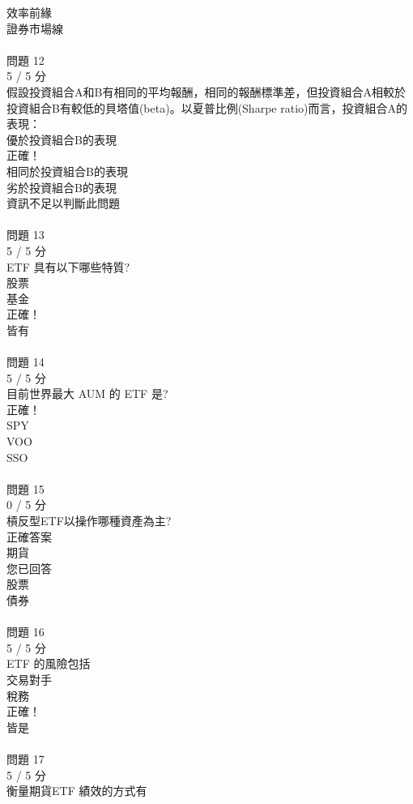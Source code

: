\begin{multicols}{3}
  效率前緣 \\
  證券市場線 \\
 \\
問題 12\\
5 / 5 分\\
假設投資組合A和B有相同的平均報酬，相同的報酬標準差，但投資組合A相較於投資組合B有較低的貝塔值(beta)。以夏普比例(Sharpe ratio)而言，投資組合A的表現：\\
  優於投資組合B的表現 \\
正確！\\
  相同於投資組合B的表現 \\
  劣於投資組合B的表現 \\
  資訊不足以判斷此問題 \\
 \\
問題 13\\
5 / 5 分\\
ETF 具有以下哪些特質?\\
  股票 \\
  基金 \\
正確！\\
  皆有 \\
 \\
問題 14\\
5 / 5 分\\
目前世界最大 AUM 的 ETF 是?\\
正確！\\
  SPY \\
  VOO \\
  SSO \\
 \\
問題 15\\
0 / 5 分\\
槓反型ETF以操作哪種資產為主?\\
正確答案\\
  期貨 \\
您已回答\\
  股票 \\
  債券 \\
 \\
問題 16\\
5 / 5 分\\
ETF 的風險包括\\
  交易對手 \\
  稅務 \\
正確！\\
  皆是 \\
 \\
問題 17\\
5 / 5 分\\
衡量期貨ETF 績效的方式有\\

\end{multicols}
